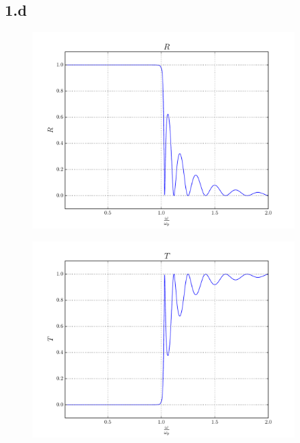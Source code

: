 \documentclass[a4paper,11pt]{article}
\begin{document}
\subsection*{1.d}
                            \begin{figure}[!ht]
                            \centering \includegraphics[width=0.9\textwidth]{Punto1BC/R.pdf}
                            \end{figure}
                            \begin{figure}[!ht]
                            \centering \includegraphics[width=0.9\textwidth]{Punto1BC/T.pdf}
                            \end{figure}
\end{document}
